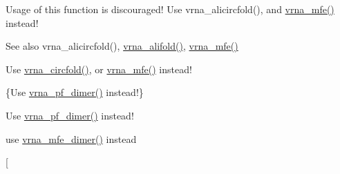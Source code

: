 \begin{DoxyRefList}
\item[\label{deprecated__deprecated000013}%
\hypertarget{deprecated__deprecated000013}{}%
Global \hyperlink{group__consensus__mfe__fold_gadbd3b0b1c144cbfb4efe704b2b260f96}{circalifold} (const char $\ast$$\ast$strings, char $\ast$structure)]Usage of this function is discouraged! Use vrna\+\_\+alicircfold(), and \hyperlink{group__mfe__fold_gabd3b147371ccf25c577f88bbbaf159fd}{vrna\+\_\+mfe()} instead! \begin{DoxySeeAlso}{See also}
vrna\+\_\+alicircfold(), \hyperlink{group__consensus__mfe__fold_ga02098d0c8790f9a37fbef6ad0cfc705c}{vrna\+\_\+alifold()}, \hyperlink{group__mfe__fold_gabd3b147371ccf25c577f88bbbaf159fd}{vrna\+\_\+mfe()} 
\end{DoxySeeAlso}

\item[\label{deprecated__deprecated000065}%
\hypertarget{deprecated__deprecated000065}{}%
Global \hyperlink{group__mfe__fold__single_ga4ac63ab3e8d9a80ced28b8052d94e423}{circfold} (const char $\ast$sequence, char $\ast$structure)]Use \hyperlink{group__mfe__fold__single_gaa0f5bf321038f404b36a6147bdae4154}{vrna\+\_\+circfold()}, or \hyperlink{group__mfe__fold_gabd3b147371ccf25c577f88bbbaf159fd}{vrna\+\_\+mfe()} instead! 
\item[\label{deprecated__deprecated000109}%
\hypertarget{deprecated__deprecated000109}{}%
Global \hyperlink{part__func__co_8h_ae5c1e7331718669bdae7a86de2be6184}{co\+\_\+pf\+\_\+fold} (char $\ast$sequence, char $\ast$structure)]\{Use \hyperlink{group__pf__cofold_ga4e5c7d06c302a7c59fc0d64dc142ca63}{vrna\+\_\+pf\+\_\+dimer()} instead!\} 
\item[\label{deprecated__deprecated000110}%
\hypertarget{deprecated__deprecated000110}{}%
Global \hyperlink{part__func__co_8h_aabfc6cb6d02b8f08ac4c92f4f5b125d9}{co\+\_\+pf\+\_\+fold\+\_\+par} (char $\ast$sequence, char $\ast$structure, vrna\+\_\+exp\+\_\+param\+\_\+t $\ast$parameters, int calculate\+\_\+bppm, int is\+\_\+constrained)]Use \hyperlink{group__pf__cofold_ga4e5c7d06c302a7c59fc0d64dc142ca63}{vrna\+\_\+pf\+\_\+dimer()} instead! 
\item[\label{deprecated__deprecated000030}%
\hypertarget{deprecated__deprecated000030}{}%
Global \hyperlink{group__mfe__cofold_gabc8517f22cfe70595ee81fc837910d52}{cofold} (const char $\ast$sequence, char $\ast$structure)]use \hyperlink{group__mfe__cofold_gaab22d10c1190f205f16a77cab9d5d3ee}{vrna\+\_\+mfe\+\_\+dimer()} instead 
\item[\label{deprecated__deprecated000031}%
\hypertarget{deprecated__deprecated000031}{}%

\end{DoxyRefList}
